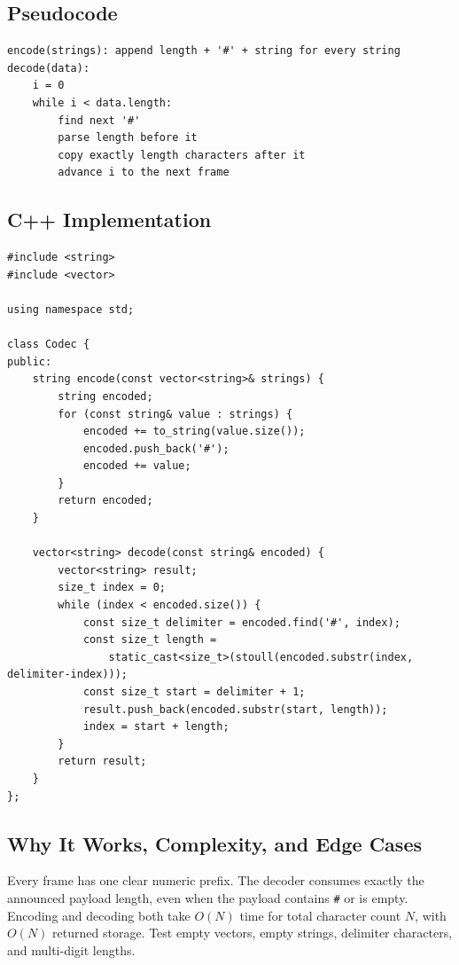\subsection{Pseudocode}
\begin{lstlisting}[style=pseudocode]
encode(strings): append length + '#' + string for every string
decode(data):
    i = 0
    while i < data.length:
        find next '#'
        parse length before it
        copy exactly length characters after it
        advance i to the next frame
\end{lstlisting}

\subsection{C++ Implementation}
\begin{lstlisting}[style=compactcode,caption={Complete C++ solution: Encode and Decode Strings}]
#include <string>
#include <vector>

using namespace std;

class Codec {
public:
    string encode(const vector<string>& strings) {
        string encoded;
        for (const string& value : strings) {
            encoded += to_string(value.size());
            encoded.push_back('#');
            encoded += value;
        }
        return encoded;
    }

    vector<string> decode(const string& encoded) {
        vector<string> result;
        size_t index = 0;
        while (index < encoded.size()) {
            const size_t delimiter = encoded.find('#', index);
            const size_t length =
                static_cast<size_t>(stoull(encoded.substr(index, delimiter-index)));
            const size_t start = delimiter + 1;
            result.push_back(encoded.substr(start, length));
            index = start + length;
        }
        return result;
    }
};
\end{lstlisting}

\subsection{Why It Works, Complexity, and Edge Cases}
Every frame has one clear numeric prefix. The decoder consumes exactly
the announced payload length, even when the payload contains \texttt{\#} or is
empty. Encoding and decoding both take \(O(N)\) time for total character count
\(N\), with \(O(N)\) returned storage. Test empty vectors, empty strings,
delimiter characters, and multi-digit lengths.

